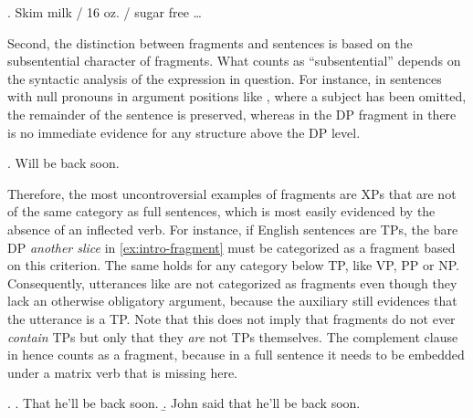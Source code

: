 \ex. Skim milk / 16 oz. / sugar free \dots

Second, the distinction between fragments and sentences is based on the subsentential character of fragments. What counts as ``subsentential'' depends on the syntactic analysis of the expression in question. For instance, in sentences with null pronouns in argument positions like \Next, where a subject has been omitted, the remainder of the sentence is preserved, whereas in the DP fragment in \LLast[a] there is no immediate evidence for any structure above the DP level.

\ex. Will be back soon.

Therefore, the most uncontroversial examples of fragments are XPs that are not of the same category as full sentences, which is most easily evidenced by the absence of an inflected verb. For instance, if English sentences are TPs, the bare DP \textit{another slice} in \ref{ex:intro-fragment} must be categorized as a fragment based on this criterion. The same holds for any category below TP, like VP, PP or NP. Consequently, utterances like \Last are not categorized as fragments even though they lack an otherwise obligatory argument, because the auxiliary still evidences that the utterance is a TP. Note that this does not imply that fragments do not ever \textit{contain} TPs but only that they \textit{are} not TPs themselves. The complement clause in \Next[a] hence counts as a fragment, because in a full sentence it needs to be embedded under a matrix verb \Next[b] that is missing here. 

\ex. \a. That he'll be back soon.
     \b. John said that he'll be back soon.

